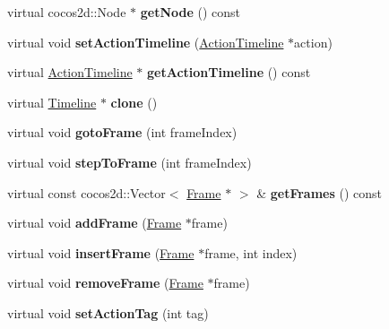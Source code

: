 \begin{DoxyCompactItemize}
virtual cocos2d\+::\+Node $\ast$ {\bfseries get\+Node} () const
\item 
\mbox{\label{classTimeline_a8cc85adef76eb58005010586d8772ec2}} 
virtual void {\bfseries set\+Action\+Timeline} (\hyperlink{classActionTimeline}{Action\+Timeline} $\ast$action)
\item 
\mbox{\label{classTimeline_ad57f63ede9b4e9312ed11a2643da6e21}} 
virtual \hyperlink{classActionTimeline}{Action\+Timeline} $\ast$ {\bfseries get\+Action\+Timeline} () const
\item 
\mbox{\label{classTimeline_a22d0a6bc0ffd45d979f3092ee5474465}} 
virtual \hyperlink{classTimeline}{Timeline} $\ast$ {\bfseries clone} ()
\item 
\mbox{\label{classTimeline_a0200f4a9e457d639a420134fe0b73d0a}} 
virtual void {\bfseries goto\+Frame} (int frame\+Index)
\item 
\mbox{\label{classTimeline_a3f12952708499f4f66429476dc92cc72}} 
virtual void {\bfseries step\+To\+Frame} (int frame\+Index)
\item 
\mbox{\label{classTimeline_a4a3f3f3d91e93a9692f4445d162f74b6}} 
virtual const cocos2d\+::\+Vector$<$ \hyperlink{classFrame}{Frame} $\ast$ $>$ \& {\bfseries get\+Frames} () const
\item 
\mbox{\label{classTimeline_a993bea21a5171aaf8e575fad5658ac58}} 
virtual void {\bfseries add\+Frame} (\hyperlink{classFrame}{Frame} $\ast$frame)
\item 
\mbox{\label{classTimeline_af78f027710796d2cfe1cffad8da5b962}} 
virtual void {\bfseries insert\+Frame} (\hyperlink{classFrame}{Frame} $\ast$frame, int index)
\item 
\mbox{\label{classTimeline_a347a3f34aa09117b07ab925d489eee58}} 
virtual void {\bfseries remove\+Frame} (\hyperlink{classFrame}{Frame} $\ast$frame)
\item 
\mbox{\label{classTimeline_a3de7aaa04c888ad279e9446a9ef5f060}} 
virtual void {\bfseries set\+Action\+Tag} (int tag)

\end{DoxyCompactItemize}
